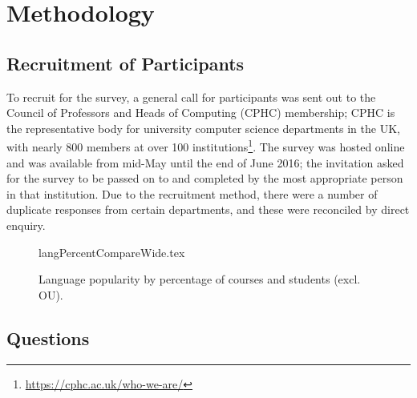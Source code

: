 \documentclass[a4paper,11pt]{article}
\begin{document}


\section{Methodology}\label{method}

\subsection{Recruitment of Participants}

To recruit for the survey, a general call for participants was sent
out to the Council of Professors and Heads of Computing (CPHC)
membership; CPHC is the representative body for university computer
science departments in the UK, with nearly 800 members at over 100
institutions\footnote{\url{https://cphc.ac.uk/who-we-are/}}. The
survey was hosted online and was available from mid-May until the end
of June 2016; the invitation asked for the survey to be passed on to and completed by
the most appropriate person in that institution. Due
to the recruitment method, there were a number of duplicate responses
from certain departments, and these were reconciled by direct enquiry.

\begin{figure}
\begin{center}
{langPercentCompareWide.tex}
\end{center}
\caption{Language popularity by percentage of courses and students (excl. OU).\label{fig:lang}}
\end{figure}

\subsection{Questions}
\end{document}
